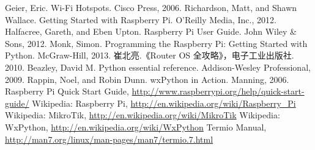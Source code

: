 \documentclass{swfcthesis}
\begin{document}
\makepreliminarypages
\frontmatter
\tableofcontents
\listoffigures
\listoftables
\mainmatter



\Appendix{} %
\begin{thebibliography}{99}
 Geier, Eric. Wi-Fi Hotspots. Cisco Press, 2006.
 Richardson, Matt, and Shawn Wallace. Getting Started with Raspberry
  Pi. O'Reilly Media, Inc., 2012.
 Halfacree, Gareth, and Eben Upton. Raspberry Pi User Guide. John Wiley
  \& Sons, 2012.
 Monk, Simon. Programming the Raspberry Pi: Getting Started with
  Python. McGraw-Hill, 2013.
 崔北亮.《Router OS 全攻略》，电子工业出版社. 2010.
 Beazley, David M. Python essential reference. Addison-Wesley
  Professional, 2009.
 Rappin, Noel, and Robin Dunn. wxPython in Action. Manning, 2006.
 Raspberry Pi Quick Start Guide,
  \url{http://www.raspberrypi.org/help/quick-start-guide/}
Wikipedia: Raspberry Pi,
  \url{http://en.wikipedia.org/wiki/Raspberry_Pi}
 Wikipedia: MikroTik, \url{http://en.wikipedia.org/wiki/MikroTik}
 Wikipedia: WxPython, \url{http://en.wikipedia.org/wiki/WxPython}
 Termio Manual, \url{http://man7.org/linux/man-pages/man7/termio.7.html}
\end{thebibliography}

\advisorinfopage{} %
\acknowledgmentspage{} %


\end{document}
